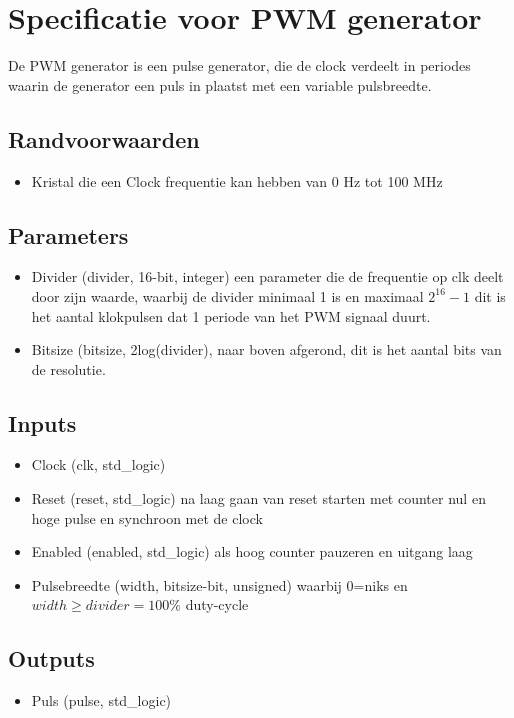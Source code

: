 \documentclass{article}
\begin{document}
\section{Specificatie voor PWM generator}
De PWM generator is een pulse generator, die de clock verdeelt in periodes waarin de generator een puls in plaatst met een variable pulsbreedte.
\subsection{Randvoorwaarden}
\begin{itemize}
\item Kristal die een Clock frequentie kan hebben van 0 Hz tot 100 MHz 
\end{itemize}
\subsection{Parameters}
\begin{itemize}
\item Divider (divider, 16-bit, integer) een parameter die de frequentie op clk deelt door zijn waarde, waarbij de divider minimaal 1 is en maximaal $2^{16} -1$ dit is het aantal klokpulsen dat 1 periode van het PWM signaal duurt.
\item Bitsize  (bitsize, 2log(divider), naar boven afgerond, dit is het aantal bits van de resolutie.

\end{itemize}
\subsection{Inputs}
\begin{itemize}
\item Clock (clk, std\_logic)
\item Reset (reset, std\_logic) na laag gaan van reset starten met counter nul en hoge pulse en synchroon met de clock
\item Enabled (enabled, std\_logic) als hoog counter pauzeren en uitgang laag
\item Pulsebreedte (width, bitsize-bit, unsigned) waarbij 0=niks en $width \geq divider = 100\%$ duty-cycle
\end{itemize}
\subsection{Outputs}
\begin{itemize}
\item Puls (pulse, std\_logic)
\end{itemize}
\end{document}
